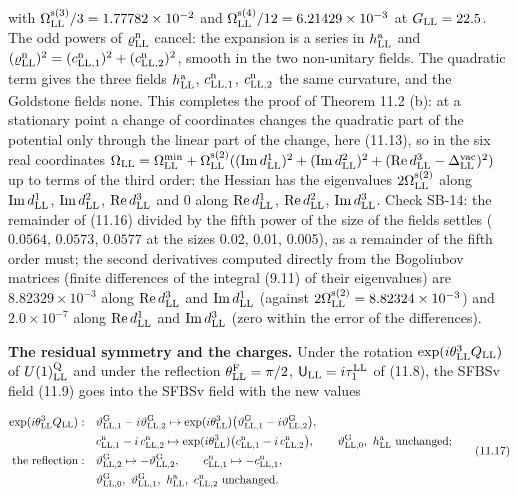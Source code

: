 \documentclass[
  10pt,
]{article}
\begin{document}
with \(\Omega^{\rm s(3)}_{\rm LL}/3=1.77782\times10^{-2}\) and
\(\Omega^{\rm s(4)}_{\rm LL}/12=6.21429\times10^{-3}\) at
\(G_{\rm LL}=22.5\). The odd powers of \(\varrho^{\rm n}_{\rm LL}\)
cancel: the expansion is a series in \(h^{\rm a}_{\rm LL}\) and
\((\varrho^{\rm n}_{\rm LL})^2=(c^{\rm n}_{{\rm LL},1})^2+(c^{\rm n}_{{\rm LL},2})^2\),
smooth in the two non-unitary fields. The quadratic term gives the three
fields \(h^{\rm a}_{\rm LL}\), \(c^{\rm n}_{{\rm LL},1}\),
\(c^{\rm n}_{{\rm LL},2}\) the same curvature, and the Goldstone fields
none. This completes the proof of Theorem 11.2 (b): at a stationary
point a change of coordinates changes the quadratic part of the
potential only through the linear part of the change, here (11.13), so
in the six real coordinates
\(\Omega_{\rm LL}=\Omega^{\rm min}_{\rm LL}+\Omega^{\rm s(2)}_{\rm LL}(({\rm Im}\,d^1_{\rm LL})^2+({\rm Im}\,d^2_{\rm LL})^2+({\rm Re}\,d^3_{\rm LL}-\Delta^{\rm vac}_{\rm LL})^2)\)
up to terms of the third order: the Hessian has the eigenvalues
\(2\Omega^{\rm s(2)}_{\rm LL}\) along \({\rm Im}\,d^1_{\rm LL}\),
\({\rm Im}\,d^2_{\rm LL}\), \({\rm Re}\,d^3_{\rm LL}\) and 0 along
\({\rm Re}\,d^1_{\rm LL}\), \({\rm Re}\,d^2_{\rm LL}\),
\({\rm Im}\,d^3_{\rm LL}\). Check SB-14: the remainder of (11.16)
divided by the fifth power of the size of the fields settles
(\(0.0564\), \(0.0573\), \(0.0577\) at the sizes 0.02, 0.01, 0.005), as
a remainder of the fifth order must; the second derivatives computed
directly from the Bogoliubov matrices (finite differences of the
integral (9.11) of their eigenvalues) are \(8.82329\times10^{-3}\) along
\({\rm Re}\,d^3_{\rm LL}\) and \({\rm Im}\,d^1_{\rm LL}\) (against
\(2\Omega^{\rm s(2)}_{\rm LL}=8.82324\times10^{-3}\)) and
\(2.0\times10^{-7}\) along \({\rm Re}\,d^1_{\rm LL}\) and
\({\rm Im}\,d^3_{\rm LL}\) (zero within the error of the differences).

\textbf{The residual symmetry and the charges.} Under the rotation
\(\exp(i\theta^3_{\rm LL}Q_{\rm LL})\) of \(U(1)^{\rm Q}_{\rm LL}\) and
under the reflection \(\theta^{\rm F}_{\rm LL}=\pi/2\),
\(\mathsf U_{\rm LL}=i\tau^{\rm LL}_1\) of (11.8), the SFBSv field
(11.9) goes into the SFBSv field with the new values

\[\begin{aligned}\exp(i\theta^3_{\rm LL}Q_{\rm LL}):&\quad\vartheta^{\rm G}_{{\rm LL},1}-i\vartheta^{\rm G}_{{\rm LL},2}\mapsto\exp(i\theta^3_{\rm LL})\big(\vartheta^{\rm G}_{{\rm LL},1}-i\vartheta^{\rm G}_{{\rm LL},2}\big),\\&\quad c^{\rm n}_{{\rm LL},1}-i\,c^{\rm n}_{{\rm LL},2}\mapsto\exp(i\theta^3_{\rm LL})\big(c^{\rm n}_{{\rm LL},1}-i\,c^{\rm n}_{{\rm LL},2}\big),\qquad\vartheta^{\rm G}_{{\rm LL},0},\ h^{\rm a}_{\rm LL}\ \text{unchanged};\\\text{the reflection}:&\quad\vartheta^{\rm G}_{{\rm LL},2}\mapsto-\vartheta^{\rm G}_{{\rm LL},2},\qquad c^{\rm n}_{{\rm LL},1}\mapsto-c^{\rm n}_{{\rm LL},1},\\&\quad\vartheta^{\rm G}_{{\rm LL},0},\ \vartheta^{\rm G}_{{\rm LL},1},\ h^{\rm a}_{\rm LL},\ c^{\rm n}_{{\rm LL},2}\ \text{unchanged}.\end{aligned}\tag{11.17}\]
\end{document}
